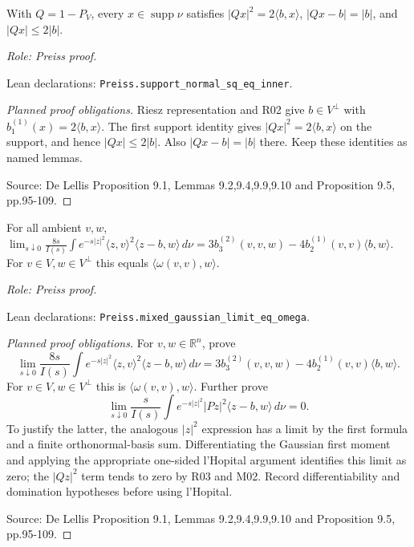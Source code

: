 \begin{lemma}
\label{lem:uniform-cylinder-identity}








With $Q=1-P_V$, every $x\in\operatorname{supp}\nu$ satisfies $|Qx|^2=2\langle b,x\rangle$, $|Qx-b|=|b|$, and $|Qx|\leq2|b|$.
\par\emph{Role: Preiss proof.}
\par Lean declarations: \texttt{Preiss.support\_normal\_sq\_eq\_inner}.
\end{lemma}
\begin{proof}[Planned proof obligations]

Riesz representation and R02 give $b\in V^\perp$ with
$b_1^{(1)}(x)=2\langle b,x\rangle$. The first support identity gives
$|Qx|^2=2\langle b,x\rangle$ on the support, and hence $|Qx|\leq2|b|$.
Also $|Qx-b|=|b|$ there. Keep these identities as named lemmas.
\par Source: De Lellis Proposition 9.1, Lemmas 9.2,9.4,9.9,9.10 and Proposition 9.5, pp.95-109.
\end{proof}

\begin{lemma}
\label{lem:rigidity-mixed-gaussian-limit}







For all ambient $v,w$, $\lim_{s\downarrow0}\frac{8s}{I(s)}\int e^{-s|z|^2}\langle z,v\rangle^2\langle z-b,w\rangle\,d\nu=3b_3^{(2)}(v,v,w)-4b_2^{(1)}(v,v)\langle b,w\rangle$. For $v\in V,w\in V^\perp$ this equals $\langle\omega(v,v),w\rangle$.
\par\emph{Role: Preiss proof.}
\par Lean declarations: \texttt{Preiss.mixed\_gaussian\_limit\_eq\_omega}.
\end{lemma}
\begin{proof}[Planned proof obligations]

For $v,w\in\mathbb R^n$, prove
\[
 \lim_{s\downarrow0}\frac{8s}{I(s)}\int e^{-s|z|^2}
 \langle z,v\rangle^2\langle z-b,w\rangle\,d\nu
 =3b_3^{(2)}(v,v,w)-4b_2^{(1)}(v,v)\langle b,w\rangle.
\]
For $v\in V,w\in V^\perp$ this is $\langle\omega(v,v),w\rangle$.
Further prove
\[
 \lim_{s\downarrow0}\frac{s}{I(s)}\int e^{-s|z|^2}
 |Pz|^2\langle z-b,w\rangle\,d\nu=0.
\]
To justify the latter, the analogous $|z|^2$ expression has a limit by the
first formula and a finite orthonormal-basis sum. Differentiating the Gaussian
first moment and applying the appropriate one-sided l'Hopital argument
identifies this limit as zero; the $|Qz|^2$ term tends to zero by R03 and M02.
Record differentiability and domination hypotheses before using l'Hopital.
\par Source: De Lellis Proposition 9.1, Lemmas 9.2,9.4,9.9,9.10 and Proposition 9.5, pp.95-109.
\end{proof}

